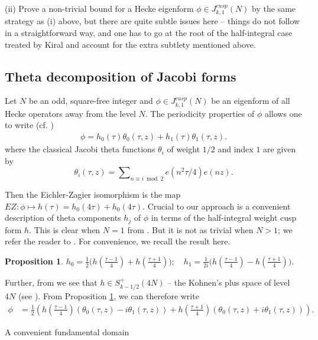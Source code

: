 \documentclass[11pt]{amsart}
\makeatletter
\numberwithin{equation}{section}
\renewcommand\subsubsection{\@secnumfont}{\bfseries}%
\renewcommand\subsubsection{\@startsection{subsubsection}{3}
  \z@{.5\linespacing\@plus.7\linespacing}{-.5em}%
  {\normalfont\bfseries}}
\theoremstyle{plain}
\newtheorem{prop}[thm]{Proposition}
\theoremstyle{definition}
\newcommand{\q}{\quad}
\newcommand{\sumn}{\sum \nolimits}
\newcommand{\jkn}{J^{cusp}_{k,1}(N)}
\makeatother
\begin{document}
(ii) Prove a non-trivial bound for a Hecke eigenform $\phi \in \jkn$ by the same strategy as (i) above, but there are quite subtle issues here -- things do not follow in a straightforward way, and one has to go at the root of the half-integral case treated by Kiral \cite{Kir} and account for the extra subtlety mentioned above.

\subsection{Theta decomposition of Jacobi forms} \label{theta-decom}
Let $N$ be an odd, square-free integer and $\phi\in\jkn$ be an eigenform of all Hecke operators away from the level $N$. 
The periodicity properties of $\phi$ allows one to write (cf. \cite{EZ})
\begin{align}
\phi = h_0(\tau) \theta_0(\tau,z) +h_1(\tau) \theta_1(\tau,z).
\end{align}
where the classical Jacobi theta functions $\theta_i$ of weight $1/2$ and index $1$ are given by
\begin{equation}
\theta_i(\tau,z)=\sumn_{n\equiv i\bmod 2} e( n^2\tau/4)e(nz).
\end{equation}

Then the Eichler-Zagier isomorphism is the map $EZ: \phi \mapsto h(\tau) =h_0(4 \tau) +h_0(4 \tau)$. Crucial to our approach is a convenient description of theta components $h_j$ of $\phi$ in terms of the half-integral weight cusp form $h$. This is clear when $N=1$ from \cite{EZ}. But it is not as trivial when $N>1$; we refer the reader to \cite[Satz 8]{Kr}. For convenience, we recall the result here. 
\begin{prop} \label{krprop}
    $h_0 = \frac{1}{2} \big ( h(\frac{\tau-1}{4}) + h(\frac{\tau+1}{4} ) \big); \q h_1 = \frac{1}{2i} \big( h(\frac{\tau-1}{4}) - h(\frac{\tau+1}{4} ) \big)$.
\end{prop}
Further, from \cite[Satz 9]{Kr} we see that $h\in S_{k-1/2}^+(4N)$ -- the Kohnen's plus space of level $4N$ (see \cite{kohnen1982newforms}). 
From Proposition \ref{krprop}, we can therefore write
\begin{align} \label{kr-reln}
\phi &= \frac{1}{2} \left( h(\frac{\tau-1}{4}) (\theta_{0}(\tau,z) - i \theta_{1}(\tau,z) ) +h(\frac{\tau+1}{4}) (\theta_{0}(\tau,z) + i \theta_{1}(\tau,z)  ) \right).
\end{align}


\subsubsection{A convenient fundamental domain}
\end{document}
